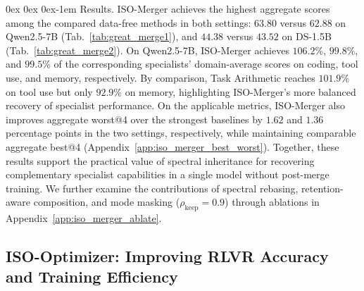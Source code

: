 \documentclass[11pt, a4paper]{utda}
\makeatletter
\renewcommand{\paragraph}{%
  \@startsection{paragraph}{4}%
  {\z@}{0ex \@plus 0ex \@minus 0ex}{-1em}%
  {\normalfont\normalsize\bfseries}%
}
\theoremstyle{plain}
\theoremstyle{definition}
\theoremstyle{remark}
\makeatother
\begin{document}
\paragraph{Results.}
ISO-Merger achieves the highest aggregate scores among the compared
data-free methods in both settings:
$63.80$ versus $62.88$ on Qwen2.5-7B
(Tab.~\ref{tab:great_merge1}), and
$44.38$ versus $43.52$ on DS-1.5B
(Tab.~\ref{tab:great_merge2}).
On Qwen2.5-7B, ISO-Merger achieves $106.2\%$, $99.8\%$, and
$99.5\%$ of the corresponding specialists' domain-average scores
on coding, tool use, and memory, respectively.
By comparison, Task Arithmetic reaches $101.9\%$ on tool use
but only $92.9\%$ on memory, highlighting ISO-Merger's more
balanced recovery of specialist performance.
On the applicable metrics, ISO-Merger also improves aggregate
worst@4 over the strongest baselines by $1.62$ and $1.36$
percentage points in the two settings, respectively, while
maintaining comparable aggregate best@4
(Appendix~\ref{app:iso_merger_best_worst}).
Together, these results support the practical value of spectral
inheritance for recovering complementary specialist capabilities
in a single model without post-merge training.
We further examine the contributions of spectral rebasing,
retention-aware composition, and mode masking
($\rho_{\mathrm{keep}}=0.9$) through ablations in
Appendix~\ref{app:iso_merger_ablate}.

\subsection{ISO-Optimizer: Improving RLVR Accuracy and Training Efficiency}
\label{sec:exp_optimizer}
\end{document}
